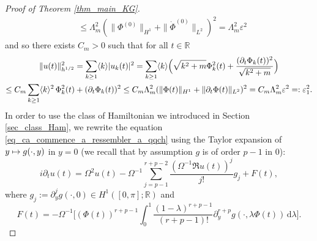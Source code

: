 \documentclass[JEP,XML,SOM,Unicode,NoEqCountersInSection,published]{cedram}
\newcommand\mto{\mathchoice{\longmapsto}{\mapsto}{\mapsto}{\mapsto}}
\theoremstyle{definition}
\begin{document}
\begin{proof}[Proof of Theorem \ref{thm_main_KG}]
\begin{equation*}
\begin{split}
&\leq \Lambda_m^2 (\|\Phi^{(0)}\|_{H^1} +\|\dot{\Phi}^{(0)}\|_{ L^2})^2 = \Lambda_m^2 \varepsilon^2
\end{split}
\end{equation*}
and so there exists $C_m>0$ such that for all $t\in \mathbb{R}$
\begin{multline*}
\|u(t)\|_{h^{1/2}}^2 = \sum_{k\geq 1} \langle k \rangle |u_k(t)|^2 = \sum_{k\geq 1} \langle k \rangle \Bigl(\sqrt{k^2+m} \Phi_k^2(t) + \frac{(\partial_t \Phi_k(t))^2}{ \sqrt{k^2+m} } \Bigr) \\
\leq C_m \sum_{k\geq 1} \langle k \rangle^2 \, \Phi_k^2(t) + (\partial_t \Phi_k(t))^2 \leq C_m\Lambda_m^2 (\| \Phi(t) \|_{H^1} + \| \partial_t \Phi(t) \|_{L^2})^2= C_m\Lambda_m^2 \varepsilon^2 =:\varepsilon_1^2.
\end{multline*}
In order to use the class of Hamiltonian we introduced in Section \ref{sec_class_Ham},
we rewrite the equation \eqref{eq_ca_commence_a_ressembler_a_qqch} using the Taylor expansion of $y\mto g(\cdot,y)$ in $y=0$ (we recall that by assumption $g$ is of order $p-1$ in $0$):
\begin{equation}
\label{eq_ca_ressemble_presque_a_qqch}
i\partial_t u(t) = \Omega^2 u(t) - \Omega^{-1} \sum_{j=p-1}^{r+p-2} \frac{(\Omega^{-1} \Re u(t))^j}{j !} g_j + F(t),
\end{equation}
where $g_j:= \partial_{y}^{j} g(\cdot,0) \in H^1([0,\pi];\mathbb{R})$ and
\[
F(t) = -\Omega^{-1} \biggl[(\Phi(t))^{r+p-1} \int_0^1 \frac{(1-\lambda)^{r+p-1}}{(r+p-1)!} \partial_{y}^{r+p} g(\cdot,\lambda \Phi(t)) \, \mathrm{d}\lambda \biggr].
\]


\end{proof}
\end{document}
